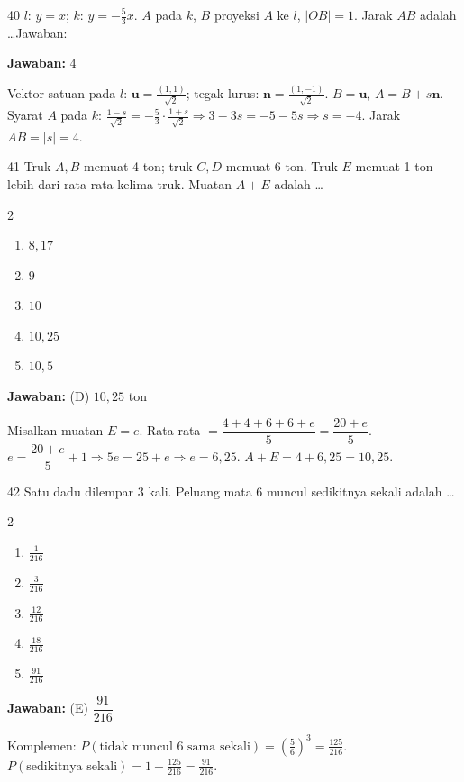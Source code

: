 \documentclass[11pt]{article}
\newcommand{\jawaban}[1]{%
  \noindent\colorbox{gold!30}{\parbox{\dimexpr\linewidth-2\fboxsep\relax}{%
    \textbf{Jawaban:} #1}}\par\smallskip}
\newenvironment{pilB}{%
  \par\smallskip\begin{multicols}{2}
  \begin{enumerate}[label=(\Alph*),leftmargin=*,itemsep=1pt,topsep=3pt]}%
  {\end{enumerate}\end{multicols}}
\begin{document}
\begin{soal}{40}
$l$: $y=x$; $k$: $y=-\tfrac53x$. $A$ pada $k$, $B$ proyeksi $A$ ke $l$, $|OB|=1$.
Jarak $AB$ adalah \ldots\hfill Jawaban:\enspace\underline{\hspace{3cm}}
\end{soal}
\begin{pembox}
\jawaban{$4$}
Vektor satuan pada $l$: $\mathbf{u}=\tfrac{(1,1)}{\sqrt2}$; tegak lurus: $\mathbf{n}=\tfrac{(1,-1)}{\sqrt2}$.
$B=\mathbf{u}$, $A=B+s\mathbf{n}$.
Syarat $A$ pada $k$: $\tfrac{1-s}{\sqrt2}=-\tfrac53\cdot\tfrac{1+s}{\sqrt2}\Rightarrow3-3s=-5-5s\Rightarrow s=-4$.
Jarak $AB=|s|=4$.
\end{pembox}


\begin{soal}{41}
Truk $A,B$ memuat 4 ton; truk $C,D$ memuat 6 ton. Truk $E$ memuat
1 ton lebih dari rata-rata kelima truk. Muatan $A+E$ adalah \ldots
\begin{pilB}\item $8{,}17$\item $9$\item $10$\item $10{,}25$\item $10{,}5$\end{pilB}
\end{soal}
\begin{pembox}
\jawaban{(D) $10{,}25$ ton}
Misalkan muatan $E=e$. Rata-rata $=\dfrac{4+4+6+6+e}{5}=\dfrac{20+e}{5}$.
$e=\dfrac{20+e}{5}+1\Rightarrow5e=25+e\Rightarrow e=6{,}25$.
$A+E=4+6{,}25=10{,}25$.
\end{pembox}

\begin{soal}{42}
Satu dadu dilempar 3 kali. Peluang mata 6 muncul sedikitnya sekali adalah \ldots
\begin{pilB}
  \item $\tfrac{1}{216}$\item $\tfrac{3}{216}$\item $\tfrac{12}{216}$
  \item $\tfrac{18}{216}$\item $\tfrac{91}{216}$
\end{pilB}
\end{soal}
\begin{pembox}
\jawaban{(E) $\dfrac{91}{216}$}
Komplemen: $P(\text{tidak muncul 6 sama sekali})=\left(\tfrac56\right)^3=\tfrac{125}{216}$.
$P(\text{sedikitnya sekali})=1-\tfrac{125}{216}=\tfrac{91}{216}$.
\end{pembox}
\end{document}

